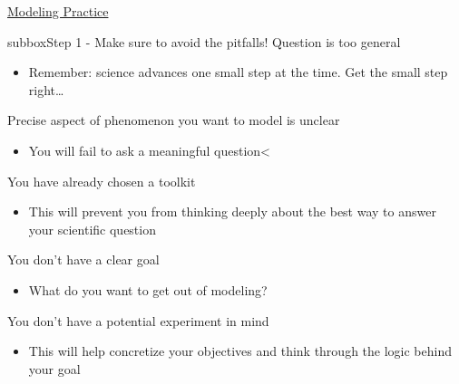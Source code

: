 \begin{textbox}{\href{https://compneuro.neuromatch.io/projects/modelingsteps/ModelingSteps_5through10.html}{Modeling Practice } }
\begin{subbox}{subbox}{Step 1 - Make sure to avoid the pitfalls! }
Question is too general
\begin{itemize}
     \item Remember: science advances one small step at the time. Get the small step right…  \end{itemize}
 Precise aspect of phenomenon you want to model is unclear
  \begin{itemize}
     \item You will fail to ask a meaningful question<  \end{itemize}
 You have already chosen a toolkit
 \begin{itemize}
     \item This will prevent you from thinking deeply about the best way to answer your scientific question
   \end{itemize}

 You don’t have a clear goal
 \begin{itemize}
     \item What do you want to get out of modeling? \end{itemize}
 You don’t have a potential experiment in mind
 \begin{itemize}
     \item 
 This will help concretize your objectives and think through the logic behind your goal
 \end{itemize}
 
  \end{subbox}
\end{textbox}
